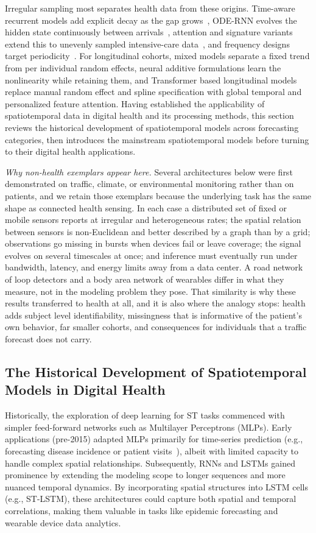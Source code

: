 \documentclass[journal]{IEEEtran}
\begin{document}
Irregular sampling most separates health data from these origins. Time-aware recurrent models add explicit decay as the gap grows~\cite{metzger2023crop}, ODE-RNN evolves the hidden state continuously between arrivals~\cite{rubanova2019latent}, attention and signature variants extend this to unevenly sampled intensive-care data~\cite{chen2023contiformer,morenopino2024rough}, and frequency designs target periodicity~\cite{zhou2022fedformer}. For longitudinal cohorts, mixed models separate a fixed trend from per individual random effects, neural additive formulations learn the nonlinearity while retaining them, and Transformer based longitudinal models replace manual random effect and spline specification with global temporal and personalized feature attention.
\else
Having established the applicability of spatiotemporal data in digital health and its processing methods, this section reviews the historical development of spatiotemporal models across forecasting categories, then introduces the mainstream spatiotemporal models before turning to their digital health applications.

\emph{Why non-health exemplars appear here.} Several architectures below were first demonstrated on traffic, climate, or environmental monitoring rather than on patients, and we retain those exemplars because the underlying task has the same shape as connected health sensing. In each case a distributed set of fixed or mobile sensors reports at irregular and heterogeneous rates; the spatial relation between sensors is non-Euclidean and better described by a graph than by a grid; observations go missing in bursts when devices fail or leave coverage; the signal evolves on several timescales at once; and inference must eventually run under bandwidth, latency, and energy limits away from a data center. A road network of loop detectors and a body area network of wearables differ in what they measure, not in the modeling problem they pose. That similarity is why these results transferred to health at all, and it is also where the analogy stops: health adds subject level identifiability, missingness that is informative of the patient's own behavior, far smaller cohorts, and consequences for individuals that a traffic forecast does not carry.

\subsection{The Historical Development of Spatiotemporal Models in Digital Health}
Historically, the exploration of deep learning for ST tasks commenced with simpler feed-forward networks such as Multilayer Perceptrons (MLPs). Early applications (pre-2015) adapted MLPs primarily for time-series prediction (e.g., forecasting disease incidence or patient visits~\cite{miotto2018deeplearning}), albeit with limited capacity to handle complex spatial relationships. Subsequently, RNNs and LSTMs gained prominence by extending the modeling scope to longer sequences and more nuanced temporal dynamics. By incorporating spatial structures into LSTM cells (e.g., ST-LSTM), these architectures could capture both spatial and temporal correlations, making them valuable in tasks like epidemic forecasting and wearable device data analytics.
\end{document}
